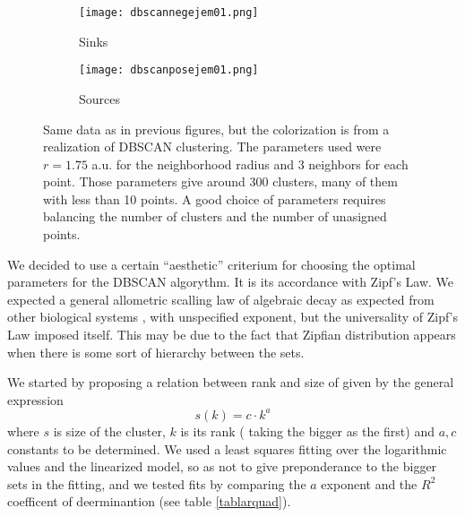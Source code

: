 \documentclass{article}
\begin{document}
\begin{figure}[h]
\centering
\begin{subfigure}{0.40\textwidth}
\texttt{[image: dbscannegejem01.png]}
\caption{Sinks}
\end{subfigure}
\begin{subfigure}{0.40\textwidth}
\texttt{[image: dbscanposejem01.png]}
\caption{Sources}
\end{subfigure}

\caption{Same data as in previous figures, but the colorization is
  from a realization of DBSCAN clustering. The parameters used were
  $r=1.75$ a.u. for the neighborhood radius and 3 neighbors for each point.
  Those parameters give around 300 clusters, many of them with less than
  10 points. A good choice of parameters requires balancing
  the number of clusters and the number of unasigned points. 
}\label{puntoscluster}


\end{figure}


We decided to use a certain ``aesthetic'' criterium for choosing the optimal parameters
for the DBSCAN algorythm.  It is its accordance with Zipf's Law. We expected
a general allometric scalling law of algebraic decay as expected
from other biological systems \cite{WestBrown2004, West99}, with unspecified
exponent, but the universality of Zipf's Law imposed itself. This may be
due to the fact that Zipfian distribution appears when there is some
sort of hierarchy between the sets.

We started by proposing a
relation between rank and size of given by the general expression
\begin{equation}
s(k)=c \cdot k^a 
\end{equation}
where $s$ is size of the cluster, $k$ is its rank ( taking the bigger as the
first) and $a, c$ constants to be determined. We used a least squares fitting
over the logarithmic values and the linearized model, so as not to give
preponderance to the bigger sets in the fitting, and we tested fits by
comparing the $a$ exponent and the $R^2$ coefficent of deerminantion (see table
\ref{tablarquad}).
\end{document}
